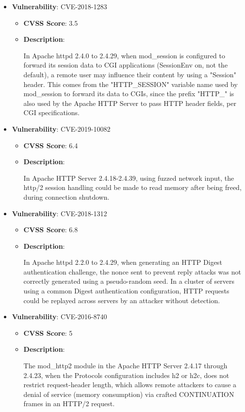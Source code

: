 \documentclass{article}
\begin{document}
\begin{itemize}
        \item \textbf{Vulnerability}: CVE-2018-1283
        \begin{itemize}
            \item \textbf{CVSS Score}:  3.5 
            \item \textbf{Description}:
            \parbox[t]{0.9\linewidth}{
                \ttfamily In Apache httpd 2.4.0 to 2.4.29, when mod\_session is configured to forward its session data to CGI applications (SessionEnv on, not the default), a remote user may influence their content by using a "Session" header. This comes from the "HTTP\_SESSION" variable name used by mod\_session to forward its data to CGIs, since the prefix "HTTP\_" is also used by the Apache HTTP Server to pass HTTP header fields, per CGI specifications.
            }
        \end{itemize}
    
        \item \textbf{Vulnerability}: CVE-2019-10082
        \begin{itemize}
            \item \textbf{CVSS Score}:  6.4 
            \item \textbf{Description}:
            \parbox[t]{0.9\linewidth}{
                \ttfamily In Apache HTTP Server 2.4.18-2.4.39, using fuzzed network input, the http/2 session handling could be made to read memory after being freed, during connection shutdown.
            }
        \end{itemize}
    
        \item \textbf{Vulnerability}: CVE-2018-1312
        \begin{itemize}
            \item \textbf{CVSS Score}:  6.8 
            \item \textbf{Description}:
            \parbox[t]{0.9\linewidth}{
                \ttfamily In Apache httpd 2.2.0 to 2.4.29, when generating an HTTP Digest authentication challenge, the nonce sent to prevent reply attacks was not correctly generated using a pseudo-random seed. In a cluster of servers using a common Digest authentication configuration, HTTP requests could be replayed across servers by an attacker without detection.
            }
        \end{itemize}
    
        \item \textbf{Vulnerability}: CVE-2016-8740
        \begin{itemize}
            \item \textbf{CVSS Score}:  5 
            \item \textbf{Description}:
            \parbox[t]{0.9\linewidth}{
                \ttfamily The mod\_http2 module in the Apache HTTP Server 2.4.17 through 2.4.23, when the Protocols configuration includes h2 or h2c, does not restrict request-header length, which allows remote attackers to cause a denial of service (memory consumption) via crafted CONTINUATION frames in an HTTP/2 request.
            }
        \end{itemize}
    

\end{itemize}
\end{document}
